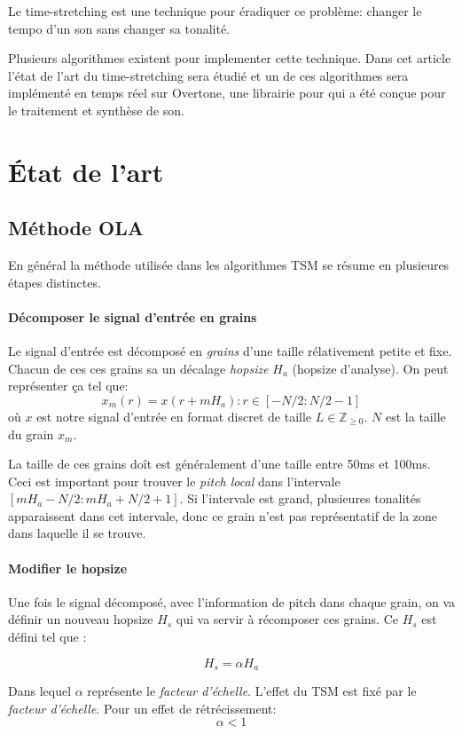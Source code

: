 \documentclass[letterpaper]{article}
\begin{document}
  Le time-stretching est une technique pour éradiquer ce problème: changer le tempo d'un
  son sans changer sa tonalité.

  Plusieurs algorithmes existent pour implementer cette technique. Dans cet article l'état de
  l'art du time-stretching sera étudié et un de ces algorithmes sera
  implémenté en temps réel sur Overtone, une librairie pour
  qui a été conçue pour le traitement et synthèse de son. 

\section{État de l'art}
\subsection{Méthode OLA}
En général la méthode utilisée dans les algorithmes TSM se résume en plusieures étapes
distinctes.

\paragraph{Décomposer le signal d'entrée en grains} Le signal d'entrée est décomposé en
\emph{grains} d'une taille rélativement petite et fixe. Chacun de ces ces grains sa un décalage \emph{hopsize} $H_{a}$ (hopsize d'analyse). On peut représenter ça tel que:
$$x_m(r) = x(r + mH_{a}) : r \in [-N/2 : N/2 -1]$$
où $x$ est notre signal d'entrée en format discret de taille $L \in \mathbb{Z}_{\geq0}$. $N$ est la
taille du grain $x_m$.

La taille de ces grains doît est généralement d'une taille entre 50ms et 100ms. Ceci est important
pour trouver le \emph{pitch local} dans l'intervale $[mH_{a} - N/2 : mH_{a} + N/2 +1]$. Si l'intervale
est grand, plusieures tonalités apparaissent dans cet intervale, donc ce grain n'est pas représentatif de la zone dans laquelle il se trouve.
\paragraph{Modifier le hopsize} Une fois le signal décomposé, avec l'information de pitch dans chaque grain, on va définir un nouveau hopsize $H_{s}$ qui va servir à récomposer ces grains. Ce $H_{s}$ est défini tel que :

$$H_{s} = \alpha H_{a}$$

Dans lequel $\alpha$ représente le \emph{facteur d'échelle}.
L'effet du TSM est fixé par le \emph{facteur d'échelle}. Pour un effet de rétrécissement:
$$\alpha < 1$$
\end{document}
